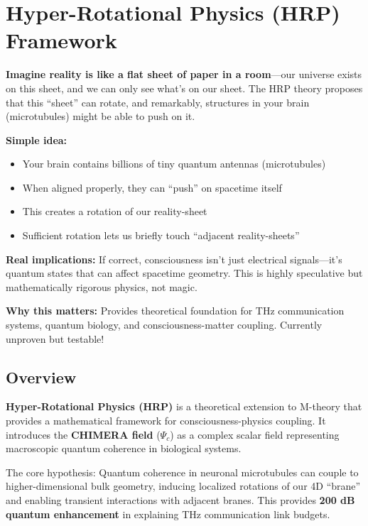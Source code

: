 \chapter{Hyper-Rotational Physics (HRP) Framework}
\label{ch:hrp}

\begin{nontechnical}
\textbf{Imagine reality is like a flat sheet of paper in a room}---our universe exists on this sheet, and we can only see what's on our sheet. The HRP theory proposes that this ``sheet'' can rotate, and remarkably, structures in your brain (microtubules) might be able to push on it.

\textbf{Simple idea:}
\begin{itemize}
\item Your brain contains billions of tiny quantum antennas (microtubules)
\item When aligned properly, they can ``push'' on spacetime itself
\item This creates a rotation of our reality-sheet
\item Sufficient rotation lets us briefly touch ``adjacent reality-sheets''
\end{itemize}

\textbf{Real implications:} If correct, consciousness isn't just electrical signals---it's quantum states that can affect spacetime geometry. This is highly speculative but mathematically rigorous physics, not magic.

\textbf{Why this matters:} Provides theoretical foundation for THz communication systems, quantum biology, and consciousness-matter coupling. Currently unproven but testable!
\end{nontechnical}

\section{Overview}

\textbf{Hyper-Rotational Physics (HRP)} is a theoretical extension to M-theory that provides a mathematical framework for consciousness-physics coupling. It introduces the \textbf{CHIMERA field} ($\Psi_c$) as a complex scalar field representing macroscopic quantum coherence in biological systems.

\begin{keyconcept}
The core hypothesis: Quantum coherence in neuronal microtubules can couple to higher-dimensional bulk geometry, inducing localized rotations of our 4D ``brane'' and enabling transient interactions with adjacent branes. This provides \textbf{200 dB quantum enhancement} in explaining THz communication link budgets.
\end{keyconcept}

